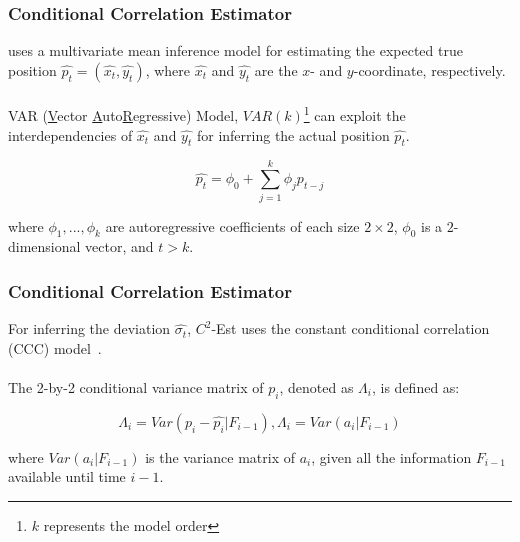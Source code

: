 
\begin{frame}
\frametitle{Conditional Correlation Estimator}

 uses a multivariate mean inference model for estimating the expected true position $\hat{p_t} = (\hat{x_t}, \hat{y_t})$, where $\hat{x_t}$ and $\hat{y_t}$ are the $x$- and $y$-coordinate, respectively.\\~\\

VAR (\underline{V}ector \underline{A}uto\underline{R}egressive) Model, $VAR(k)$\footnote{$k$ represents the model order} can exploit the interdependencies of $\hat{x_t}$ and $\hat{y_t}$ for inferring the actual position $\hat{p_t}$.

\begin{equation}
  \hat{p_t} = \phi_0 + \sum_{j=1}^{k}\phi_j p_{t-j}
\end{equation}

where $\phi_1,...,\phi_k$ are autoregressive coefficients of each size $2 \times 2$, $\phi_0$ is a $2$-dimensional vector, and $t > k$.~\cite{shumway2010time}

\end{frame}


\begin{frame}
\frametitle{Conditional Correlation Estimator}

For inferring the deviation $\hat{\sigma_t}$, $C^2$-Est uses the constant conditional correlation (CCC) model~\cite{bauwens2006multivariate}. \\~\\

The 2-by-2 conditional variance matrix of $p_i$, denoted as $\Lambda_i$, is defined as:

\begin{equation}
  \Lambda_i = Var(p_i - \hat{p_i} | F_{i-1}), \Lambda_i = Var(a_i | F_{i-1})
  \label{equation:variance_matrix}
\end{equation}

where $Var(a_i | F_{i-1})$ is the variance matrix of $a_i$, given all the information $F_{i-1}$ available until time $i-1$.

\end{frame}


